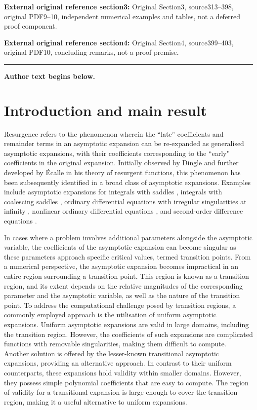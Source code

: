 \documentclass[11pt]{article}
\numberwithin{equation}{section}
\numberwithin{equation}{section}
\begin{document}
\noindent\textbf{External original reference section3:} Original Section3, source313–398, original PDF9–10, independent numerical examples and tables, not a deferred proof component.\par
\noindent\textbf{External original reference section4:} Original Section4, source399–403, original PDF10, concluding remarks, not a proof premise.\par
\medskip\hrule\medskip\noindent\textbf{Author text begins below.}\par

\section{Introduction and main result}

Resurgence refers to the phenomenon wherein the ``late'' coefficients and remainder terms in an asymptotic expansion can be re-expanded as generalised asymptotic expansions, with their coefficients corresponding to the ``early" coefficients in the original expansion. Initially observed by Dingle \cite{Dingle1973} and further developed by \'Ecalle \cite{Ecalle1981,Ecalle1981-II,Ecalle1981-III} in his theory of resurgent functions, this phenomenon has been subsequently identified in a broad class of asymptotic expansions. Examples include asymptotic expansions for integrals with saddles \cite{Bennett2018,Berry1991,Howls1997}, integrals with coalescing saddles \cite{OldeDaalhuis2000}, ordinary differential equations with irregular singularities at infinity \cite{Murphy1997, OldeDaalhuis1998b}, nonlinear ordinary differential equations \cite{OldeDaalhuis2005a,OldeDaalhuis2005b}, and second-order difference equations \cite{OldeDaalhuis2004}.

In cases where a problem involves additional parameters alongside the asymptotic variable, the coefficients of the asymptotic expansion can become singular as these parameters approach specific critical values, termed transition points. From a numerical perspective, the asymptotic expansion becomes impractical in an entire region surrounding a transition point. This region is known as a transition region, and its extent depends on the relative magnitudes of the corresponding parameter and the asymptotic variable, as well as the nature of the transition point. To address the computational challenge posed by transition regions, a commonly employed approach is the utilisation of uniform asymptotic expansions. Uniform asymptotic expansions are valid in large domains, including the transition region. However, the coefficients of such expansions are complicated functions with removable singularities, making them difficult to compute. Another solution is offered by the lesser-known transitional asymptotic expansions, providing an alternative approach. In contrast to their uniform counterparts, these expansions hold validity within smaller domains. However, they possess simple polynomial coefficients that are easy to compute. The region of validity for a transitional expansion is large enough to cover the transition region, making it a useful alternative to uniform expansions.
\end{document}

